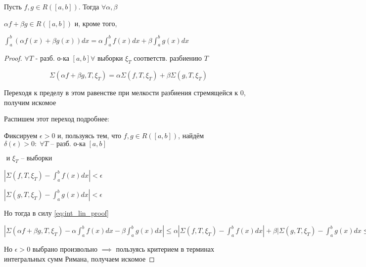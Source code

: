 \begin{theorem}
    Пусть $f, g \in R([a, b])$. Тогда $\forall \alpha, \beta$

    $\alpha f + \beta g \in R([a, b])$ и, кроме того,

    $\int_a^b (\alpha f(x) + \beta g(x)) dx = \alpha \int_a^b f(x)dx + \beta \int_a^b g(x)dx$
\end{theorem}
\begin{proof}
    $\forall T$ - разб. о-ка $[a, b] \forall$ выборки $\xi_T$ соответств. разбиению $T$

    \begin{equation}
    \Sigma(\alpha f + \beta g, T, \xi_T) = \alpha \Sigma(f, T, \xi_T) + \beta \Sigma(g, T, \xi_T) \label{eq:int_lin_proof}
    \end{equation}

    Переходя к пределу в этом равенстве при мелкости разбиения стремящейся к 0, получим искомое\bigskip

    Распишем этот переход подробнее:

    Фиксируем $\epsilon > 0$ и, пользуясь тем, что $f, g \in R([a, b])$,
    найдём $\delta(\epsilon) > 0:\; \forall T\text{ -- разб. о-ка }[a, b]$
    
    $\text{ и } \xi_T\text{ -- выборки  }$ 

    $|\Sigma(f, T, \xi_T) - \int_a^b f(x)dx| < \epsilon$

    $|\Sigma(g, T, \xi_T) - \int_a^b g(x)dx| < \epsilon$

    Но тогда в силу \eqref{eq:int_lin_proof}

    $|\Sigma (\alpha f + \beta g, T, \xi_T) - \alpha \int_a^b f(x)dx - \beta \int_a^b g(x)dx| \leqslant \alpha |\Sigma(f, T, \xi_T) - \int_a^b f(x)dx| + \beta|\Sigma(g, T, \xi_T) - \int_a^b g(x)dx \leqslant \alpha \epsilon + \beta \epsilon$

    Но $\epsilon > 0$ выбрано произвольно $\implies$ пользуясь критерием в терминах интегральных сумм Римана, получаем искомое
\end{proof}

